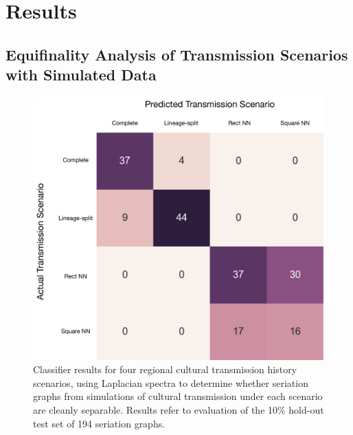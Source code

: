     \section{Results}\label{metapop:sec:results}
    
    
    
    \subsection{Equifinality Analysis of Transmission Scenarios with Simulated Data}\label{metapop:sec:results-simulation}
    
    \begin{figure}[ht]
    \centering
    \includegraphics[scale=0.40]{graphics/multipleseriation/metapop-confusion-matrix.pdf}
    \caption{Classifier results for four regional cultural transmission history scenarios, using Laplacian spectra to determine whether seriation graphs from simulations of cultural transmission under each scenario are cleanly separable.  Results refer to evaluation of the 10\% hold-out test set of 194 seriation graphs.}
    \label{metapop:fig:confusion-matrix-testset}
    \end{figure}
    
